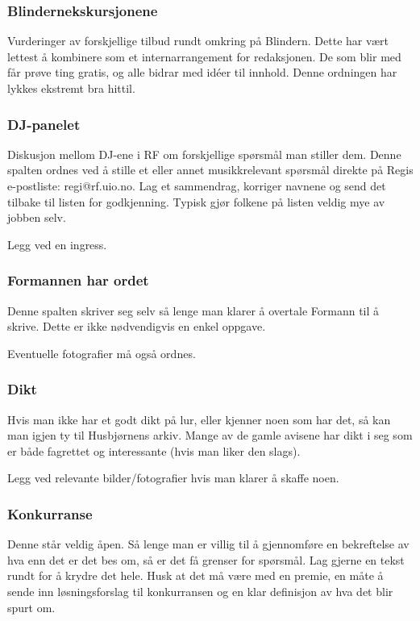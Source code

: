 \subsubsection{Blindernekskursjonene}
 Vurderinger av forskjellige tilbud rundt omkring på Blindern. Dette
har vært lettest å kombinere som et internarrangement for redaksjonen.
De som blir med får prøve ting gratis, og alle bidrar med idéer til
innhold. Denne ordningen har lykkes ekstremt bra hittil.

\subsubsection{DJ-panelet}
 Diskusjon mellom DJ-ene i RF om forskjellige spørsmål man stiller
dem. Denne spalten ordnes ved å stille et eller annet musikkrelevant
spørsmål direkte på Regis e-postliste: regi@rf.uio.no. Lag et
sammendrag, korriger navnene og send det tilbake til listen for
godkjenning. Typisk gjør folkene på listen veldig mye av jobben selv.

 Legg ved en ingress.

\subsubsection{Formannen har ordet}
 Denne spalten skriver seg selv så lenge man klarer å overtale Formann
til å skrive. Dette er ikke nødvendigvis en enkel oppgave.

 Eventuelle fotografier må også ordnes.

\subsubsection{Dikt}
 Hvis man ikke har et godt dikt på lur, eller kjenner noen som har
det, så kan man igjen ty til Husbjørnens arkiv. Mange av de gamle
avisene har dikt i seg som er både fagrettet og interessante (hvis man
liker den slags).

 Legg ved relevante bilder/fotografier hvis man klarer å skaffe noen.

\subsubsection{Konkurranse}
 Denne står veldig åpen. Så lenge man er villig til å gjennomføre en
bekreftelse av hva enn det er det bes om, så er det få grenser for
spørsmål. Lag gjerne en tekst rundt for å krydre det hele. Husk at det
må være med en premie, en måte å sende inn løsningsforslag til
konkurransen og en klar definisjon av hva det blir spurt om.

